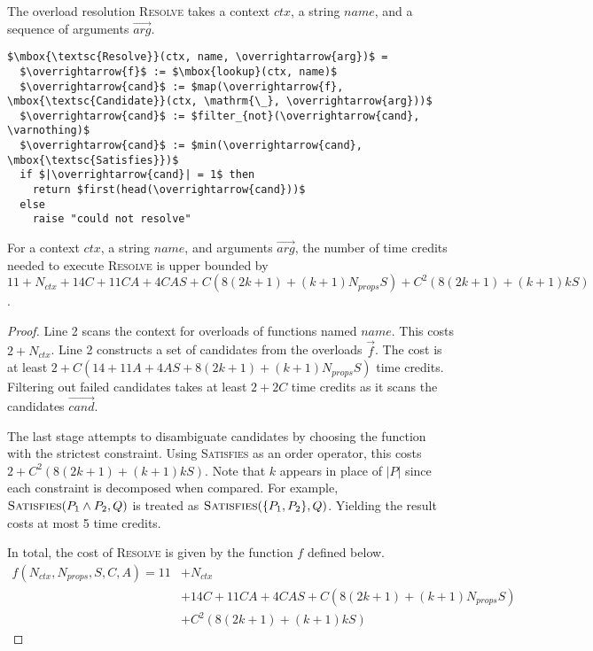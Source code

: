 The overload resolution \textsc{Resolve} takes a context $ctx$, a string $name$, and a sequence of arguments $\overrightarrow{arg}$.

  \begin{center}
    \begin{lstlisting}[style=numberedalgo, mathescape]
$\mbox{\textsc{Resolve}}(ctx, name, \overrightarrow{arg})$ =
  $\overrightarrow{f}$ := $\mbox{lookup}(ctx, name)$
  $\overrightarrow{cand}$ := $map(\overrightarrow{f}, \mbox{\textsc{Candidate}}(ctx, \mathrm{\_}, \overrightarrow{arg}))$
  $\overrightarrow{cand}$ := $filter_{not}(\overrightarrow{cand}, \varnothing)$
  $\overrightarrow{cand}$ := $min(\overrightarrow{cand}, \mbox{\textsc{Satisfies}})$
  if $|\overrightarrow{cand}| = 1$ then
    return $first(head(\overrightarrow{cand}))$
  else
    raise "could not resolve"
    \end{lstlisting}
  \end{center}

\begin{theorem}
  \label{thm:resolve_time_complexity}
  For a context $ctx$, a string $name$, and arguments $\overrightarrow{arg}$, the number of time credits needed to execute \textsc{Resolve} is upper bounded by $11 + N_{ctx} + 14C + 11CA + 4CAS + C(8(2k+1) + (k+1)N_{props}S) + C^2(8(2k+1) + (k+1)kS)$.
\end{theorem}
  \begin{proof}
    Line 2 scans the context for overloads of functions named $name$. This costs $2 + N_{ctx}$. Line 2 constructs a set of candidates from the overloads $\overrightarrow{f}$. The cost is at least $2 + C(14 + 11A + 4AS + 8(2k+1) + (k+1)N_{props}S)$ time credits. Filtering out failed candidates takes at least $2 + 2C$ time credits as it scans the candidates $\overrightarrow{cand}$.

    The last stage attempts to disambiguate candidates by choosing the function with the strictest constraint. Using \textsc{Satisfies} as an order operator, this costs $2 + C^2(8(2k+1) + (k+1)kS)$. Note that $k$ appears in place of $|P|$ since each constraint is decomposed when compared. For example, $\mbox{\textsc{Satisfies}}(P_1 \wedge P_2, Q)$ is treated as $\mbox{\textsc{Satisfies}}(\{P_1, P_2 \}, Q)$. Yielding the result costs at most 5 time credits.

    In total, the cost of \textsc{Resolve} is given by the function $f$ defined below.
      \begin{align*}
        f(N_{ctx}, N_{props}, S, C, A) = 11 &+ N_{ctx} \\
          &+ 14C + 11CA + 4CAS + C(8(2k+1) + (k+1)N_{props}S) \\
          &+ C^2(8(2k+1) + (k+1)kS)
      \end{align*}
  \end{proof}

